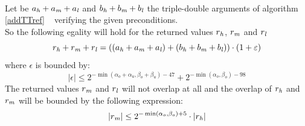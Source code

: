 \begin{theorem} ~ \\
Let be $a_{\mathit{h}} + a_{\mathit{m}} + a_{\mathit{l}}$ and $b_{\mathit{h}} + b_{\mathit{m}} + b_{\mathit{l}}$ the triple-double
arguments of algorithm \ref{addTTref} \AddTT~ verifying the given 
preconditions.\\
So the following egality will hold for the returned values $r_{\mathit{h}}$, $r_{\mathit{m}}$ and $r_{\mathit{l}}$ 
$$r_{\mathit{h}} + r_{\mathit{m}} + r_{\mathit{l}} = \left(\left(a_{\mathit{h}} + a_{\mathit{m}} + a_{\mathit{l}} \right) + \left( b_{\mathit{h}} + b_{\mathit{m}} + b_{\mathit{l}} \right)\right) \cdot \left(1 + \varepsilon\right)$$
where $\epsilon$ is bounded by:
$$\left \vert \epsilon \right \vert \leq 2^{-\min\left(\alpha_o + \alpha_u,\beta_o + \beta_u\right) - 47} + 
2^{-\min\left( \alpha_o, \beta_o\right) - 98}$$
The returned values $r_{\mathit{m}}$ and $r_{\mathit{l}}$ will not overlap at all and the
overlap of $r_{\mathit{h}}$ and $r_{\mathit{m}}$ will be bounded by the following expression:
$$\left \vert r_{\mathit{m}} \right \vert \leq 2^{-\min\left( \alpha_o, \beta_o \right) + 5} \cdot \left \vert r_{\mathit{h}} \right \vert$$
\end{theorem}

